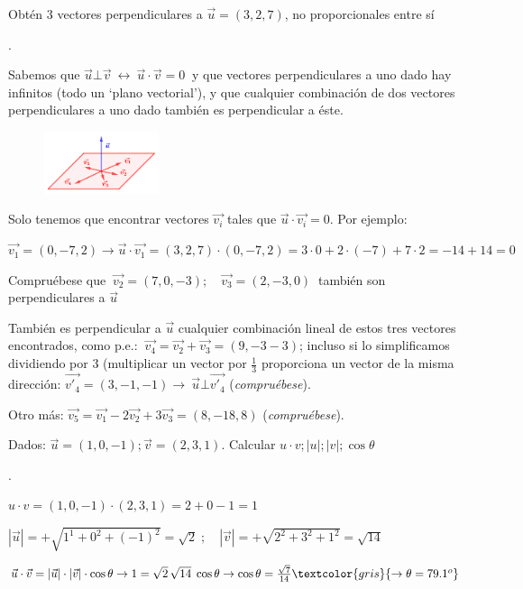 \begin{ejer}
	Obtén 3 vectores perpendiculares a $\vec u=(3,2,7)$, no proporcionales entre sí
\end{ejer}

\begin{proofw}\renewcommand{\qedsymbol}{$\diamond$}.
	
	\begin{multicols}{2}
	Sabemos que  
	$  \vec u \bot \vec v \ \leftrightarrow \ \vec u \cdot \vec v=0 \ $
	y que vectores perpendiculares a uno dado hay infinitos (todo un `plano vectorial'), y que cualquier combinación de dos vectores perpendiculares a uno dado también es perpendicular a éste.
	\begin{figure}[H]
	\centering
	\includegraphics[width=0.30\textwidth]{imagenes/imagenes10/T10IM15.png}
	\end{figure}	
	\end{multicols}	
	Solo tenemos que encontrar vectores $\vec {v_i}$ tales que $\vec u \cdot \vec {v_i}=0$. Por ejemplo:
	
	$\vec {v_1} = (0,-7,2) \to \vec u \cdot \vec {v_1}=(3,2,7)\cdot (0,-7,2)=3 \cdot 0 + 2 \cdot (-7) + 7 \cdot 2 =-14+14=0$
	
	Compruébese que $\ \vec {v_2} = (7,0,-3);  \quad \vec {v_3} = (2,-3,0) \ $ también son perpendiculares a $\vec u$
	
	También es perpendicular a $\vec u$ cualquier combinación lineal de estos tres vectores encontrados, como p.e.:
	$\ \vec {v_4}  = \vec {v_2}+\vec {v_3}= (9,-3-3)$; incluso si lo simplificamos dividiendo por 3 (multiplicar un vector por $\frac 1 3 $  proporciona un vector de la misma dirección: $\vec {v'_4}=(3,-1,-1) \to   \ \vec u \bot \vec {v'_4} $ (\emph{compruébese}).
	
	Otro más: $\vec {v_5}=\vec {v_1} - 2 \vec {v_2}+ 3\vec {v_3}= (8,-18,8)$ (\emph{compruébese}).
\end{proofw}


\begin{ejer}

	Dados:  $\vec u=(1,0,-1); \vec v=(2,3,1)$. Calcular $u \cdot v; |u|; |v|; \cos \theta $
\end{ejer}


\begin{proofw}\renewcommand{\qedsymbol}{$\diamond$}
.

$u \cdot v = (1,0,-1) \cdot (2,3,1)=2+0-1=1$

$|\vec u|=+\sqrt{1^1+0^2+(-1)^2}=\sqrt{2}\; ; \quad |\vec v|=+\sqrt{2^2+3^2+1^2}=\sqrt{14}$

$\vec u \cdot \vec v = |\vec u|\cdot |\vec v| \cdot \cos \theta \to 
1=\sqrt 2 \, \sqrt{14} \; \cos \theta \to \cos \theta = \frac {\sqrt{7}}{14} \textcolor{gris}{\to \theta=79.1^o}  $

	
\end{proofw}



